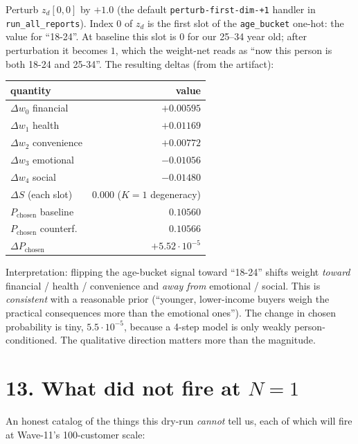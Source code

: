 \documentclass[11pt,a4paper]{article}
\begin{document}
Perturb $z_d[0, 0]$ by $+1.0$ (the default
\texttt{perturb-first-dim-+1} handler in
\texttt{run\_all\_reports}). Index $0$ of $z_d$ is the first slot of
the \texttt{age\_bucket} one-hot: the value for ``18-24''. At baseline
this slot is $0$ for our 25--34 year old; after perturbation it
becomes $1$, which the weight-net reads as ``now this person is both
18-24 and 25-34''. The resulting deltas (from the artifact):

\begin{center}\small
\begin{tabular}{l r}\toprule
quantity & value \\ \midrule
$\Delta w_0$ financial   & $+0.00595$ \\
$\Delta w_1$ health      & $+0.01169$ \\
$\Delta w_2$ convenience & $+0.00772$ \\
$\Delta w_3$ emotional   & $-0.01056$ \\
$\Delta w_4$ social      & $-0.01480$ \\
$\Delta S$ (each slot)   & $0.000$ ($K = 1$ degeneracy) \\
$P_{\text{chosen}}$ baseline   & $0.10560$ \\
$P_{\text{chosen}}$ counterf.  & $0.10566$ \\
$\Delta P_{\text{chosen}}$     & $+5.52 \cdot 10^{-5}$ \\
\bottomrule
\end{tabular}\end{center}

Interpretation: flipping the age-bucket signal toward ``18-24'' shifts
weight \emph{toward} financial / health / convenience and \emph{away
from} emotional / social. This is \emph{consistent} with a reasonable
prior (``younger, lower-income buyers weigh the practical consequences
more than the emotional ones''). The change in chosen probability is
tiny, $5.5 \cdot 10^{-5}$, because a 4-step model is only weakly
person-conditioned. The qualitative direction matters more than the
magnitude.

\section*{13. What did not fire at $N = 1$}

An honest catalog of the things this dry-run \emph{cannot} tell us,
each of which will fire at Wave-11's 100-customer scale:
\end{document}
